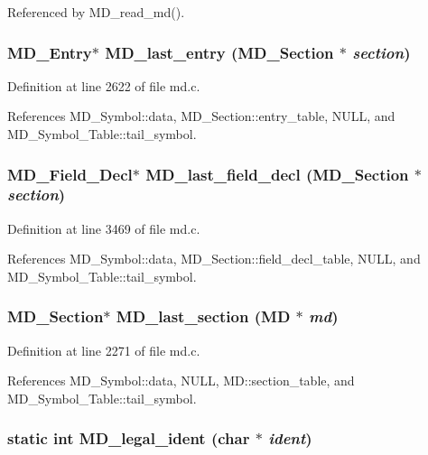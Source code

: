 Referenced by MD\_\-read\_\-md().
\subsubsection{\setlength{\rightskip}{0pt plus 5cm}\bf{MD\_\-Entry}$\ast$ MD\_\-last\_\-entry (\bf{MD\_\-Section} $\ast$ {\em section})}\label{md_8c_15e07021cd847b69992db2c5f4bc0f4e}




Definition at line 2622 of file md.c.

References MD\_\-Symbol::data, MD\_\-Section::entry\_\-table, NULL, and MD\_\-Symbol\_\-Table::tail\_\-symbol.
\subsubsection{\setlength{\rightskip}{0pt plus 5cm}\bf{MD\_\-Field\_\-Decl}$\ast$ MD\_\-last\_\-field\_\-decl (\bf{MD\_\-Section} $\ast$ {\em section})}\label{md_8c_16c0da1adb82de9cb915f918f89298e0}




Definition at line 3469 of file md.c.

References MD\_\-Symbol::data, MD\_\-Section::field\_\-decl\_\-table, NULL, and MD\_\-Symbol\_\-Table::tail\_\-symbol.
\subsubsection{\setlength{\rightskip}{0pt plus 5cm}\bf{MD\_\-Section}$\ast$ MD\_\-last\_\-section (\bf{MD} $\ast$ {\em md})}\label{md_8c_67bb9c0b436d73924f512e5399865d94}




Definition at line 2271 of file md.c.

References MD\_\-Symbol::data, NULL, MD::section\_\-table, and MD\_\-Symbol\_\-Table::tail\_\-symbol.
\subsubsection{\setlength{\rightskip}{0pt plus 5cm}static int MD\_\-legal\_\-ident (char $\ast$ {\em ident})\hspace{0.3cm}{\tt  [static]}}\label{md_8c_f14511725b4dafac075736079011bc83}




